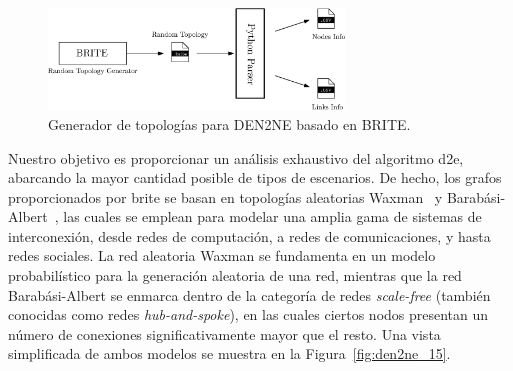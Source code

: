 \begin{figure}[ht!]
    \centering
    \includegraphics[width=0.7\textwidth]{fig/05_den2ne/den2ne_14.eps}
    \caption{Generador de topologías para DEN2NE basado en BRITE.}
    \label{fig:den2ne_14}
\end{figure}

Nuestro objetivo es proporcionar un análisis exhaustivo del algoritmo \gls{d2e}, abarcando la mayor cantidad posible de tipos de escenarios. De hecho, los grafos proporcionados por \gls{brite} se basan en topologías aleatorias Waxman~\cite{waxman1988routing} y Barabási-Albert~\cite{barabasi1999emergence}, las cuales se emplean para modelar una amplia gama de sistemas de interconexión, desde redes de computación, a redes de comunicaciones, y hasta redes sociales. La red aleatoria Waxman se fundamenta en un modelo probabilístico para la generación aleatoria de una red, mientras que la red Barabási-Albert se enmarca dentro de la categoría de redes \textit{scale-free} (también conocidas como redes \textit{hub-and-spoke}), en las cuales ciertos nodos presentan un número de conexiones significativamente mayor que el resto. Una vista simplificada de ambos modelos se muestra en la Figura~\ref{fig:den2ne_15}.


